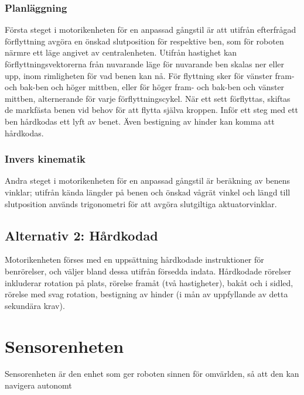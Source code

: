 \documentclass[a4paper,titlepage,12pt]{article}
\begin{document}
    	\subsubsection{Planläggning}
	Första steget i motorikenheten för en anpassad gångstil är att utifrån efterfrågad
    	förflyttning avgöra en önskad slutposition för respektive ben, som för roboten närmre 
    	ett läge angivet av centralenheten. Utifrån hastighet kan förflyttningsvektorerna 
    	från nuvarande läge för nuvarande ben skalas ner eller upp, inom rimligheten för vad
    	benen kan nå. För flyttning sker för vänster fram- och bak-ben och höger 
    	mittben, eller för höger fram- och bak-ben och vänster mittben, alternerande för varje
    	förflyttningscykel. När ett sett förflyttas, skiftas de markfästa benen vid behov för 
    	att flytta själva kroppen. Inför ett steg med ett ben hårdkodas ett lyft av benet. 
	Även bestigning av hinder kan komma att hårdkodas.
    
    	\subsubsection{Invers kinematik}
    	Andra steget i motorikenheten för en anpassad gångstil är beräkning av benens vinklar;
    	utifrån kända längder på benen  och önskad vågrät vinkel och längd till slutposition 
    	används trigonometri för att avgöra slutgiltiga aktuatorvinklar.
    
    	\subsection{Alternativ 2: Hårdkodad}
    	Motorikenheten förses med en uppsättning hårdkodade instruktioner för benrörelser, och
    	väljer bland dessa utifrån försedda indata. Hårdkodade rörelser inkluderar rotation på 
    	plats, rörelse framåt (två hastigheter), bakåt och i sidled, rörelse med svag rotation, 
    	bestigning av hinder (i mån av uppfyllande av detta sekundära krav). 
	
	\section{Sensorenheten}
    
    Sensorenheten är den enhet som ger roboten sinnen för omvärlden, så att den
    kan navigera autonomt 
\end{document}

